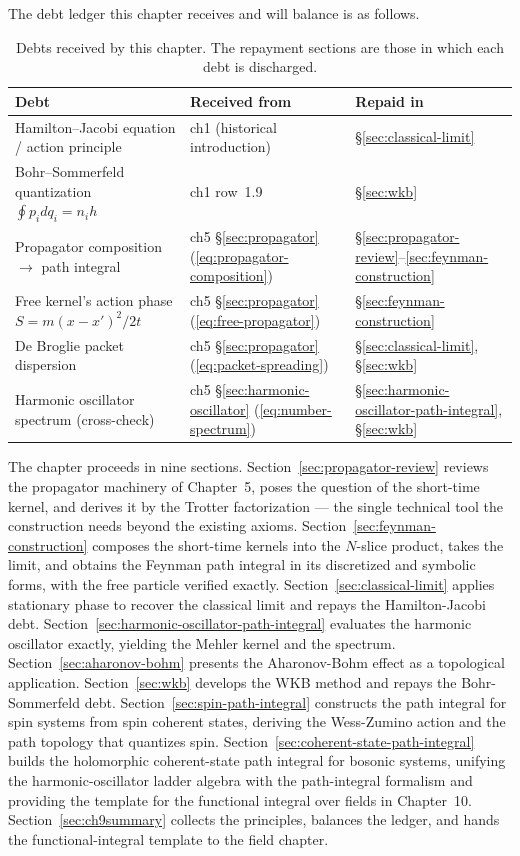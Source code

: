 The debt ledger this chapter receives and will balance is as follows.

\begin{table}[htbp!]
\centering
\caption{Debts received by this chapter. The repayment sections are those in which each debt is discharged.}
\label{tab:ch9-debts-received}
\begin{tabular}{lll}
\toprule
Debt & Received from & Repaid in \\
\midrule
Hamilton--Jacobi equation / action principle & ch1 (historical introduction) & \S\ref{sec:classical-limit} \\
Bohr--Sommerfeld quantization $\oint p_i dq_i = n_i h$ & ch1 row~1.9 & \S\ref{sec:wkb} \\
Propagator composition $\to$ path integral & ch5 \S\ref{sec:propagator} (\eqref{eq:propagator-composition}) & \S\ref{sec:propagator-review}--\ref{sec:feynman-construction} \\
Free kernel's action phase $S = m(x-x')^2/2t$ & ch5 \S\ref{sec:propagator} (\eqref{eq:free-propagator}) & \S\ref{sec:feynman-construction} \\
De Broglie packet dispersion & ch5 \S\ref{sec:propagator} (\eqref{eq:packet-spreading}) & \S\ref{sec:classical-limit}, \S\ref{sec:wkb} \\
Harmonic oscillator spectrum (cross-check) & ch5 \S\ref{sec:harmonic-oscillator} (\eqref{eq:number-spectrum}) & \S\ref{sec:harmonic-oscillator-path-integral}, \S\ref{sec:wkb} \\
\bottomrule
\end{tabular}
\end{table}

\medskip\noindent The chapter proceeds in nine sections. Section~\ref{sec:propagator-review} reviews the propagator machinery of Chapter~5, poses the question of the short-time kernel, and derives it by the Trotter factorization --- the single technical tool the construction needs beyond the existing axioms. Section~\ref{sec:feynman-construction} composes the short-time kernels into the $N$-slice product, takes the limit, and obtains the Feynman path integral in its discretized and symbolic forms, with the free particle verified exactly. Section~\ref{sec:classical-limit} applies stationary phase to recover the classical limit and repays the Hamilton-Jacobi debt. Section~\ref{sec:harmonic-oscillator-path-integral} evaluates the harmonic oscillator exactly, yielding the Mehler kernel and the spectrum. Section~\ref{sec:aharonov-bohm} presents the Aharonov-Bohm effect as a topological application. Section~\ref{sec:wkb} develops the WKB method and repays the Bohr-Sommerfeld debt. Section~\ref{sec:spin-path-integral} constructs the path integral for spin systems from spin coherent states, deriving the Wess-Zumino action and the path topology that quantizes spin. Section~\ref{sec:coherent-state-path-integral} builds the holomorphic coherent-state path integral for bosonic systems, unifying the harmonic-oscillator ladder algebra with the path-integral formalism and providing the template for the functional integral over fields in Chapter~10. Section~\ref{sec:ch9summary} collects the principles, balances the ledger, and hands the functional-integral template to the field chapter.


